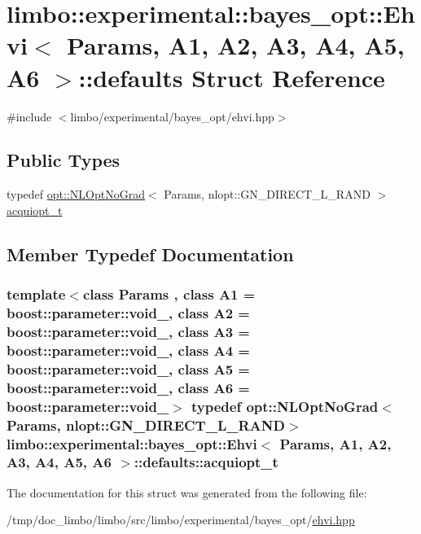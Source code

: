 \hypertarget{structlimbo_1_1experimental_1_1bayes__opt_1_1_ehvi_1_1defaults}{}\section{limbo\+:\+:experimental\+:\+:bayes\+\_\+opt\+:\+:Ehvi$<$ Params, A1, A2, A3, A4, A5, A6 $>$\+:\+:defaults Struct Reference}
\label{structlimbo_1_1experimental_1_1bayes__opt_1_1_ehvi_1_1defaults}


{\ttfamily \#include $<$limbo/experimental/bayes\+\_\+opt/ehvi.\+hpp$>$}

\subsection*{Public Types}
\begin{DoxyCompactItemize}
\item 
typedef \hyperlink{structlimbo_1_1opt_1_1_n_l_opt_no_grad}{opt\+::\+N\+L\+Opt\+No\+Grad}$<$ Params, nlopt\+::\+G\+N\+\_\+\+D\+I\+R\+E\+C\+T\+\_\+\+L\+\_\+\+R\+A\+N\+D $>$ \hyperlink{structlimbo_1_1experimental_1_1bayes__opt_1_1_ehvi_1_1defaults_a3d7a04bbbd73b4f95710c29fd88551bf}{acquiopt\+\_\+t}
\end{DoxyCompactItemize}


\subsection{Member Typedef Documentation}
\hypertarget{structlimbo_1_1experimental_1_1bayes__opt_1_1_ehvi_1_1defaults_a3d7a04bbbd73b4f95710c29fd88551bf}{}
\subsubsection[{acquiopt\+\_\+t}]{\setlength{\rightskip}{0pt plus 5cm}template$<$class Params , class A1  = boost\+::parameter\+::void\+\_\+, class A2  = boost\+::parameter\+::void\+\_\+, class A3  = boost\+::parameter\+::void\+\_\+, class A4  = boost\+::parameter\+::void\+\_\+, class A5  = boost\+::parameter\+::void\+\_\+, class A6  = boost\+::parameter\+::void\+\_\+$>$ typedef {\bf opt\+::\+N\+L\+Opt\+No\+Grad}$<$Params, nlopt\+::\+G\+N\+\_\+\+D\+I\+R\+E\+C\+T\+\_\+\+L\+\_\+\+R\+A\+N\+D$>$ {\bf limbo\+::experimental\+::bayes\+\_\+opt\+::\+Ehvi}$<$ Params, A1, A2, A3, A4, A5, A6 $>$\+::{\bf defaults\+::acquiopt\+\_\+t}}\label{structlimbo_1_1experimental_1_1bayes__opt_1_1_ehvi_1_1defaults_a3d7a04bbbd73b4f95710c29fd88551bf}


The documentation for this struct was generated from the following file\+:\begin{DoxyCompactItemize}
\item 
/tmp/doc\+\_\+limbo/limbo/src/limbo/experimental/bayes\+\_\+opt/\hyperlink{bayes__opt_2ehvi_8hpp}{ehvi.\+hpp}\end{DoxyCompactItemize}
